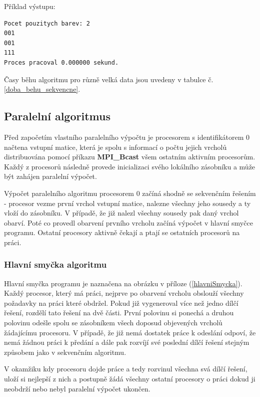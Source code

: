 \documentclass[12pt]{article}
\begin{document}
Příklad výstupu:
\begin{verbatim}
Pocet pouzitych barev: 2
001
001
111
Proces pracoval 0.000000 sekund.
\end{verbatim}

Časy běhu algoritmu pro různě velká data jsou uvedeny v tabulce č. \ref{doba_behu_sekvencne}.

\subsection{Paralelní algoritmus}

Před započetím vlastního paralelního výpočtu je procesorem s identifikátorem 0 načtena vstupní matice, která je spolu s informací o počtu jejich vrcholů distribuována pomocí příkazu \textbf{MPI\_Bcast} všem ostatním aktivním procesorům. Každý z procesorů následně provede inicializaci svého lokálního zásobníku a může být zahájen paralelní výpočet.

Výpočet paralelního algoritmu procesorem 0 začíná shodně se sekvenčním řešením - procesor vezme první vrchol vstupní matice, nalezne všechny jeho sousedy a ty vloží do zásobníku. V případě, že již nalezl všechny sousedy pak daný vrchol obarví. Poté co provedl obarvení prvního vrcholu začíná výpočet v hlavní smyčce programu. Ostatní procesory aktivně čekají a ptají se ostatních procesorů na práci.

\subsubsection{Hlavní smyčka algoritmu}

Hlavní smyčka programu je naznačena na obrázku v příloze (\ref{hlavniSmycka}). Každý procesor, který má práci, nejprve po obarvení vrcholu obslouží všechny požadavky na práci které obdržel. Pokud již vygeneroval více než jedno dílčí řešení, rozdělí tato řešení na dvě části. První polovinu si ponechá a druhou polovinu odešle spolu se zásobníkem všech doposud objevených vrcholů žádajícímu procesoru. V případě, že již nemá dostatek práce k odeslání odpoví, že nemá žádnou práci k předání a dále pak rozvíjí své poslední dílčí řešení stejným způsobem jako v sekvenčním algoritmu.

V okamžiku kdy procesoru dojde práce a tedy rozvinul všechna svá dílčí řešení, uloží si nejlepší z nich a postupně žádá všechny ostatní procesory o práci dokud ji neobdrží nebo nebyl paralelní výpočet ukončen.
\end{document}
